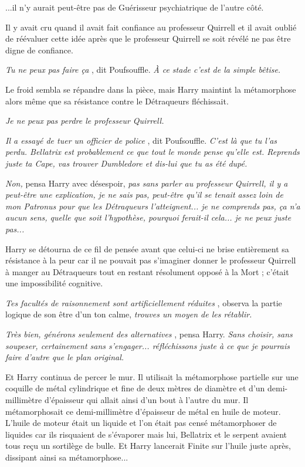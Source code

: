 ...il n'y aurait peut-être pas de Guérisseur psychiatrique de l'autre côté.

Il y avait cru quand il avait fait confiance au professeur Quirrell et il avait oublié de réévaluer cette idée après que le professeur Quirrell se soit révélé ne pas être digne de confiance.

\emph{Tu ne peux pas faire ça} , dit Poufsouffle. \emph{À ce stade c'est de la simple bêtise.} 

Le froid sembla se répandre dans la pièce, mais Harry maintint la métamorphose alors même que sa résistance contre le Détraqueurs fléchissait.

\emph{Je ne peux pas perdre le professeur Quirrell.} 

\emph{Il a essayé de tuer un officier de police} , dit Poufsouffle. \emph{C'est là que tu l'as perdu. Bellatrix est probablement ce que tout le monde pense qu'elle est. Reprends juste ta Cape, vas trouver Dumbledore et dis-lui que tu as été dupé.} 

\emph{Non,}  pensa Harry avec désespoir, \emph{pas sans parler au professeur Quirrell, il y a peut-être une explication, je ne sais pas, peut-être qu'il se tenait assez loin de mon Patronus pour que les Détraqueurs l'atteignent... je ne comprends pas, ça n'a aucun sens, quelle que soit l'hypothèse, pourquoi ferait-il cela... je ne peux juste pas...} 

Harry se détourna de ce fil de pensée avant que celui-ci ne brise entièrement sa résistance à la peur car il ne pouvait pas s'imaginer donner le professeur Quirrell à manger au Détraqueurs tout en restant résolument opposé à la Mort ; c'était une impossibilité cognitive.

\emph{Tes facultés de raisonnement sont artificiellement réduites} , observa la partie logique de son être d'un ton calme, \emph{trouves un moyen de les rétablir.} 

\emph{Très bien, générons seulement des alternatives} , pensa Harry. \emph{Sans choisir, sans soupeser, certainement sans s'engager... réfléchissons juste à ce que je pourrais faire d'autre que le plan original.} 

Et Harry continua de percer le mur. Il utilisait la métamorphose partielle sur une coquille de métal cylindrique et fine de deux mètres de diamètre et d'un demi-millimètre d'épaisseur qui allait ainsi d'un bout à l'autre du mur. Il métamorphosait ce demi-millimètre d'épaisseur de métal en huile de moteur. L'huile de moteur était un liquide et l'on était pas censé métamorphoser de liquides car ils risquaient de s'évaporer mais lui, Bellatrix et le serpent avaient tous reçu un sortilège de bulle. Et Harry lancerait Finite sur l'huile juste après, dissipant ainsi sa métamorphose...

